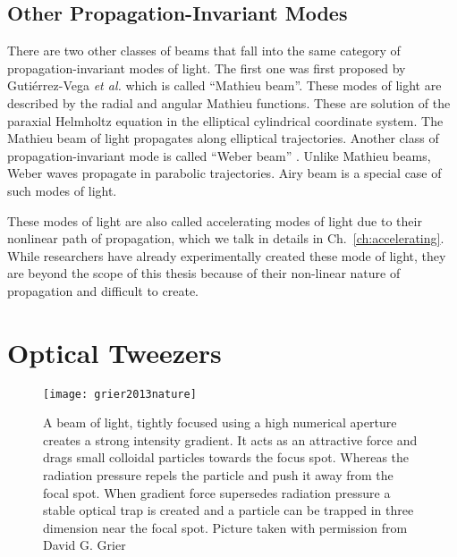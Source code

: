 \subsection{Other Propagation-Invariant Modes}

There are two other classes of beams that fall into the same category of propagation-invariant modes of light. The first one was first proposed by Gutiérrez-Vega \emph{et al.} \cite{Gutierrez-Vega:00} which is called ``Mathieu beam''. These modes of light are described by the radial and angular Mathieu functions. These are solution of the paraxial Helmholtz equation in the elliptical cylindrical coordinate system. The Mathieu beam of light propagates along elliptical trajectories. Another class of propagation-invariant mode is called ``Weber beam'' \cite{Bandres_2013}. Unlike Mathieu beams, Weber waves propagate in parabolic trajectories. Airy beam is a special case of such modes of light.

These modes of light are also called accelerating modes of light due to their nonlinear path of propagation, which we talk in details in Ch.~\eqref{ch:accelerating}. While researchers have already experimentally created these mode of light, they are beyond the scope of this thesis because of their non-linear nature of propagation and difficult to create.

\section{Optical Tweezers}
\begin{figure}[t!]
  \centering
  \texttt{[image: grier2013nature]}
  \caption{A beam of light, tightly focused using a high numerical aperture creates a strong intensity gradient. It acts as an attractive force and drags small colloidal particles towards the focus spot. Whereas the radiation pressure repels the particle and push it away from the focal spot. When gradient force supersedes radiation pressure a stable optical trap is created and a particle can be trapped in three dimension near the focal spot. Picture taken with permission from David G. Grier \cite{grier2003nature}}
  \label{fig:Optical tweezers}
\end{figure}

